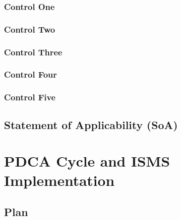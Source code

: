 \subsubsection{Control One}





\subsubsection{Control Two}


\subsubsection{Control Three}


\subsubsection{Control Four}


\subsubsection{Control Five}


\subsection{Statement of Applicability (SoA)}


\section{PDCA Cycle and ISMS Implementation}


\subsection{Plan}

